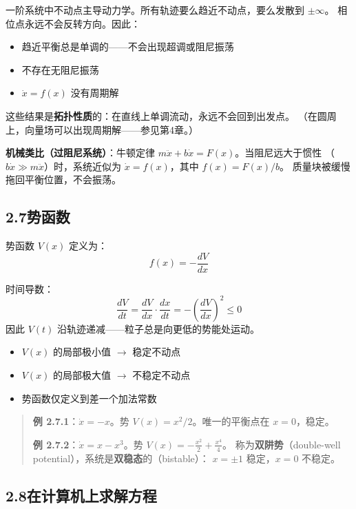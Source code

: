 \documentclass[12pt,a4paper]{article}
\begin{document}
一阶系统中不动点主导动力学。所有轨迹要么趋近不动点，要么发散到 $\pm\infty$。
相位点永远不会反转方向。因此：
\begin{itemize}[nosep]
  \item 趋近平衡总是单调的——不会出现超调或阻尼振荡
  \item 不存在无阻尼振荡
  \item $\dot{x} = f(x)$ 没有周期解
\end{itemize}

这些结果是\textbf{拓扑性质}的：在直线上单调流动，永远不会回到出发点。
（在圆周上，向量场可以出现周期解——参见第4章。）

\textbf{机械类比（过阻尼系统）}：牛顿定律 $m\ddot{x} + b\dot{x} = F(x)$。当阻尼远大于惯性
（$b\dot{x} \gg m\ddot{x}$）时，系统近似为 $\dot{x} = f(x)$，其中 $f(x) = F(x)/b$。
质量块被缓慢拖回平衡位置，不会振荡。

\subsection{2.7\quad 势函数}

势函数 $V(x)$ 定义为：
\begin{equation}
f(x) = -\frac{dV}{dx}
\end{equation}

时间导数：
\[
\frac{dV}{dt} = \frac{dV}{dx} \cdot \frac{dx}{dt} = -\left(\frac{dV}{dx}\right)^2 \leq 0
\]
因此 $V(t)$ 沿轨迹递减——粒子总是向更低的势能处运动。
\begin{itemize}[nosep]
  \item $V(x)$ 的局部极小值 $\to$ 稳定不动点
  \item $V(x)$ 的局部极大值 $\to$ 不稳定不动点
  \item 势函数仅定义到差一个加法常数
\end{itemize}

\begin{quote}
\textbf{例 2.7.1}：$\dot{x} = -x$。势 $V(x) = x^2/2$。唯一的平衡点在 $x = 0$，稳定。

\medskip
\textbf{例 2.7.2}：$\dot{x} = x - x^3$。势 $V(x) = -\frac{x^2}{2} + \frac{x^4}{4}$。
称为\textbf{双阱势}（double-well potential），系统是\textbf{双稳态}的（bistable）：
$x = \pm 1$ 稳定，$x = 0$ 不稳定。
\end{quote}

\subsection{2.8\quad 在计算机上求解方程}
\end{document}
